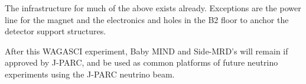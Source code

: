 The infrastructure for much of the above exists already.
Exceptions are the power line for the magnet and the electronics and holes in the B2 floor to anchor the detector support structures.

After this WAGASCI experiment, Baby MIND and Side-MRD's will remain if approved by J-PARC, and be used as common platforms of future neutrino experiments using the J-PARC neutrino beam.
